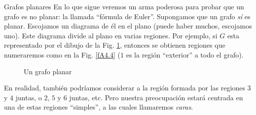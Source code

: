 \begin{section}{Grafos planares}
En lo que sigue veremos un arma poderosa para probar que un grafo es no planar: la llamada ``fórmula de Euler''.   Supongamos que un grafo {\em sí} es planar. Escojamos un diagrama
de él en el plano (puede haber muchos, escojamos uno). Este diagrama divide al plano en varias regiones. Por ejemplo, si $G$ esta representado por el dibujo de la Fig. \ref{fA4.3}, entonces se obtienen regiones que numeraremos como en la Fig. \ref{fA4.4} ($1$ es la región ``exterior'' a todo el grafo).

\begin{figure}[h]
    \begin{center}
    \end{center}
\caption{Un grafo planar} \label{fA4.3}
\end{figure}

En realidad, también podríamos considerar a la región formada por las regiones $3$ y $4$ juntas, o $2$, $5$ y $6$ juntas, etc. Pero nuestra preocupación estará centrada en una de estas regiones ``simples'', a las cuales llamaremos {\em caras}.  


\end{section}
